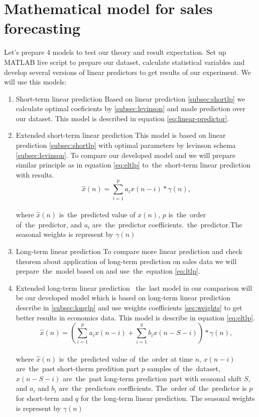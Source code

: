 \section{Mathematical model for sales forecasting}\label{subsec:calculate_models}
Let's prepare 4 models to test our theory and result expectation.  Set up MATLAB live script to prepare our dataset,
calculate statistical variables and develop several versions of linear predictors to get results of our experiment.
We will use this models:
\begin{enumerate}
    \item Short-term linear prediction 
    Based on linear prediction \ref{subsec:shortlp} we calculate optimal coeficients by \ref{subsec:levinson} and
    made prediction over our dataset. This model is described in equation \ref{eq:linear-predictor}.

    \item Extended short-term linear prediction 
    This model is based on linear prediction \ref{subsec:shortlp} with optimal parameters by levinson
    schema \ref{subsec:levinson}. To compare our developed model \label{subsec:extlonglp} and we will prepare
    similar principle as in equation \ref{eq:eltlp} to~the~short-term linear prediction with results.
    \begin{equation} \label{eq:slp}
        \hat{x}(n) = \sum_{i=1}^{p} a_i x(n-i) * \gamma(n),
    \end{equation}
    \\
    where $\hat{x}(n)$ is~the~predicted value of $x(n)$, $p$ is~the~order of~the~predictor, and $a_i$ are~the~predictor coefficients.~the~predictor.The seasonal weights is represent by $\gamma(n)$

    \item Long-term linear prediction 
    To compare more linear prediction and check theorem about application of long-term prediction on sales data
    we will prepare~the~model based on \label{subsec:longlp} and use~the~equation \ref{eq:ltlp}.

    \item Extended long-term linear prediction
    ~the~last model in our comparison will be our developed model which is based on long-term linear prediction
    describe in \ref{subsec:longlp} and use weights coefficients \ref{sec:weights} to get better results in
    economics data. This model is describe in equation \ref{eq:eltlp}.
    \begin{equation} \label{eq:eltlp}
        \hat{x}(n) = \left(\sum_{i=1}^{p} a_i x(n-i) + \sum_{i=1}^{q} b_i x(n-S-i)\right) * \gamma(n),
    \end{equation}
    \\
    where $\hat{x}(n)$ is~the~predicted value of~the~order at time $n$, $x(n-i)$ are~the~past short-therm predition part $p$ samples of~the~dataset, $x(n-S-i)$ are~the~past long-term prediction part with seasonal shift $S$, and $a_i$ and $b_i$ are~the~predictors coefficients. The~order of~the~predictor is $p$ for short-term and $q$ for the long-term linear prediction. The seasonal weights is represent by $\gamma(n)$
\end{enumerate}
